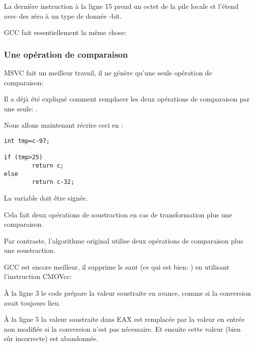 La dernière instruction  à la ligne 15 prend un octet de la pile locale
et l'étend avec des zéro à un type de donnée -bit.

GCC \NonOptimizing fait essentiellement la même chose:



\subsubsection{Une opération de comparaison}
\label{toupper_one_comparison}

MSVC \Optimizing fait un meilleur travail, il ne génère qu'une seule opération de
comparaison:



Il a déjà été expliqué comment remplacer les deux opérations de comparaison par une
seule: .

Nous allons maintenant récrire ceci en \CCpp:

\begin{lstlisting}[style=customc]
int tmp=c-97;

if (tmp>25)
        return c;
else
        return c-32;
\end{lstlisting}

La variable  doit être signée.

Cela fait deux opérations de soustraction en cas de transformation plus une comparaison.

Par contraste, l'algorithme original utilise deux opérations de comparaison plus
une soustraction.

GCC \Optimizing est encore meilleur, il supprime le saut (ce qui est bien: )
en utilisant l'instruction CMOVcc:



À la ligne 3 le code prépare la valeur soustraite en avance, comme si la conversion
avait toujours lieu.

À la ligne 5 la valeur soustraite dans EAX est remplacée par la valeur en entrée
non modifiée si la conversion n'est pas nécessaire.
Et ensuite cette valeur (bien sûr incorrecte) est abandonnée.

